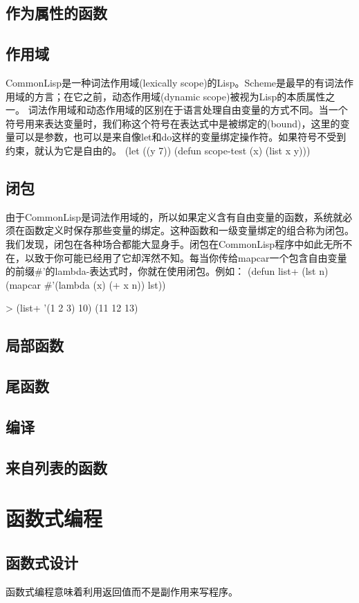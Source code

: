 \documentclass{ctexart}
\begin{document}
\subsection{作为属性的函数}
\label{sec-2-4}
\subsection{作用域}
\label{sec-2-5}
CommonLisp是一种词法作用域(lexically scope)的Lisp。Scheme是最早的有词法作用域的方言；在它之前，动态作用域(dynamic scope)被视为Lisp的本质属性之一。
词法作用域和动态作用域的区别在于语言处理自由变量的方式不同。当一个符号用来表达变量时，我们称这个符号在表达式中是被绑定的(bound)，这里的变量可以是参数，也可以是来自像let和do这样的变量绑定操作符。如果符号不受到约束，就认为它是自由的。
(let ((y 7))
  (defun scope-test (x)
    (list x y)))
\subsection{闭包}
\label{sec-2-6}
由于CommonLisp是词法作用域的，所以如果定义含有自由变量的函数，系统就必须在函数定义时保存那些变量的绑定。这种函数和一级变量绑定的组合称为闭包。
我们发现，闭包在各种场合都能大显身手。闭包在CommonLisp程序中如此无所不在，以致于你可能已经用了它却浑然不知。每当你传给mapcar一个包含自由变量的前缀\#'的lambda-表达式时，你就在使用闭包。例如：
(defun list+ (lst n)
  (mapcar \#'(lambda (x) (+ x n))
    lst))

> (list+ '(1 2 3) 10)
(11 12 13)

\subsection{局部函数}
\label{sec-2-7}
\subsection{尾函数}
\label{sec-2-8}
\subsection{编译}
\label{sec-2-9}
\subsection{来自列表的函数}
\label{sec-2-10}
\section{函数式编程}
\label{sec-3}
\subsection{函数式设计}
\label{sec-3-1}
函数式编程意味着利用返回值而不是副作用来写程序。
\end{document}
